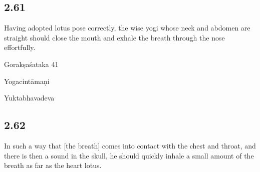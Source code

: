 \begin{ekdosis}
\subsection*{2.61}
\begin{translation}[hp02_061]
Having adopted lotus pose correctly, the wise yogi whose neck and abdomen are straight should close the mouth and exhale the breath through the nose effortfully.
\end{translation}

\begin{sources}[hp02_061]
Gorakṣaśataka 41

\begin{versinnote}
\end{versinnote}
\end{sources}

\begin{testimonia}[hp02_061]
Yogacintāmaṇi

\begin{versinnote}
\end{versinnote}

Yuktabhavadeva

\begin{versinnote}
\end{versinnote}
\end{testimonia}

\begin{philcomm}[hp02_061]
\end{philcomm}

\subsection*{2.62}
\begin{translation}[hp02_062]
In such a way that [the breath] comes into contact with the chest and throat, and there is then a sound in the skull, he should quickly inhale a small amount of the breath as far as the heart lotus.
\end{translation}


\end{ekdosis}
